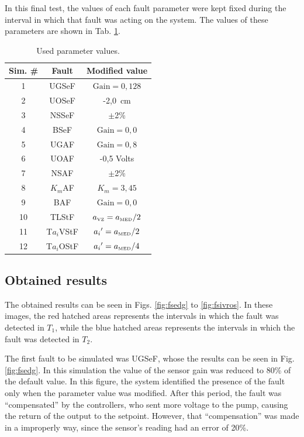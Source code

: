 \documentclass[10pt,fleqn,a4paper]{article}
\begin{document}
In this final test, the values of each fault parameter were kept fixed during
the interval in which that fault was acting on the system. The values of these
parameters are shown in Tab. \ref{tab:used_val}.

\begin{table}[htb]
\centering
\caption{Used parameter values.}
\label{tab:used_val}
\begin{tabular}{|c|c|c|}
\hline
{\bf Sim. \#} & {\bf Fault} & {\bf Modified value}\\
\hline
1 & UGSeF & $\text{Gain} = 0,128$\\
\hline
2 & UOSeF & -2,0\ cm\\
\hline
3 & NSSeF & $\pm$2\%\\
\hline
4 & BSeF & $\text{Gain} = 0,0$\\
\hline
5 & UGAF & $\text{Gain} = 0,8$\\
\hline
6 & UOAF & -0,5 Volts\\
\hline
7 & NSAF & $\pm$2\%\\
\hline
8 & $K_m$AF & $K_m = 3,45$\\ 
\hline
9 & BAF & $\text{Gain} = 0,0$\\
\hline
10 & TLStF & $a_{\text{\tiny VZ}} = a_{\text{\tiny MED}}/2$\\
\hline
11 & T$a_i$VStF & ${a_i}' = a_{\text{\tiny MED}}/2$\\
\hline
12 & T$a_i$OStF & ${a_i}' = a_{\text{\tiny MED}}/4$\\
\hline
\end{tabular}
\end{table}

\subsection{Obtained results}
The obtained results can be seen in Figs. \ref{fig:fsedg} to \ref{fig:fsivros}.
In these images, the red hatched areas represents the intervals in which the
fault was detected in $T_1$, while the blue hatched areas represents the
intervals in which the fault was detected in $T_2$.

The first fault to be simulated was UGSeF, whose the results can be seen in Fig.
\ref{fig:fsedg}. In this simulation the value of the sensor gain was reduced to
80\% of the default value. In this figure, the system identified the presence
of the fault only when the parameter value was modified. After this period, the
fault was ``compensated'' by the controllers, who sent more voltage to the pump,
causing the return of the output to the setpoint. However, that ``compensation''
was made in a improperly way, since the sensor's reading had an error of 20\%.
\end{document}
